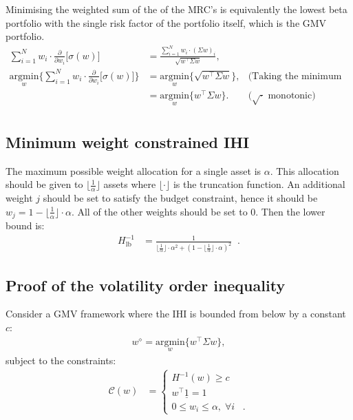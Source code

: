 \documentclass[
]{article}
\begin{document}
Minimising the weighted sum of the of the MRC's is equivalently the lowest beta portfolio with the
single risk factor of the portfolio itself, which is the GMV portfolio.
\begin{align*}
\sum_{i = 1}^N w_i \cdot \frac{\partial}{\partial w_i} \Big [ \sigma(w) \Big ] & = \frac{\sum_{i = 1}^N w_i \cdot (\Sigma w)_i}{\sqrt{w^\intercal \Sigma w}}, & \\
\underset{w}{\text{argmin}} \Big \{\sum_{i = 1}^N w_i \cdot \frac{\partial}{\partial w_i} \Big [ \sigma(w) \Big ]  \Big \} & = \underset{w}{\text{argmin}} \Big \{ \sqrt{w^\intercal \Sigma w} \Big\},&   \text{(Taking the minimum on   both sides)}\\
& = \underset{w}{\text{argmin}} \Big \{w^\intercal \Sigma w \} . &  \text{($\sqrt{\cdot}$ monotonic)}\\
\end{align*}

\hypertarget{ihimax}{%
\subsection{Minimum weight constrained IHI}\label{ihimax}}

The maximum possible weight allocation for a single asset is \(\alpha\). This allocation should be given
to \(\lfloor \frac{1}{\alpha} \rfloor\) assets where \(\lfloor \cdot \rfloor\) is the truncation function.
An additional weight \(j\) should be set to satisfy the budget constraint, hence it should be
\(w_j = 1 - \lfloor \frac{1}{\alpha} \rfloor \cdot \alpha\). All of the other weights should be set to
0. Then the lower bound is:
\begin{align*}
H_{\text{lb}}^{-1} & = \frac{1}{\lfloor \frac{1}{\alpha} \rfloor \cdot \alpha^2 + (1- \lfloor \frac{1}{\alpha}\rfloor \cdot \alpha)^2} \;\; .
\end{align*}

\hypertarget{volineq}{%
\subsection{Proof of the volatility order inequality}\label{volineq}}

Consider a GMV framework where the IHI is bounded from below by a constant \(c\):
\begin{align*} 
w^\diamond = \underset{w}{\text{argmin}} \Big \{ w^\intercal \Sigma w \Big \},
\end{align*}
subject to the constraints:
\begin{align*}
\mathcal{C}(w) &= 
\begin{cases}
H^{-1}(w) \geq c \\
w^\intercal \underline{1} = 1 \;\; \\
0 \leq w_i \leq \alpha, \; \forall i \;\;\; .
\end{cases}
\end{align*}
\end{document}
